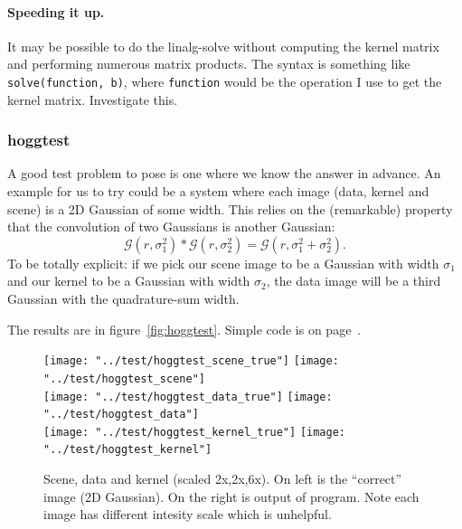 \documentclass[letterpaper, 11pt]{article}
\begin{document}
\paragraph{Speeding it up.} It may be possible to do the linalg-solve without computing the kernel matrix and performing numerous matrix products. The syntax is something like \texttt{solve(function, b)}, where \texttt{function} would be the operation I use to get the kernel matrix. Investigate this.


\subsubsection{hoggtest}

A good test problem to pose is one where we know the answer in advance. An example for us to try could be a system where each image (data, kernel and scene) is a 2D Gaussian of some width. This relies on the (remarkable) property that the convolution of two Gaussians is another Gaussian:
\begin{equation}
	\mathcal{G}(r,\sigma_1^2) \ast \mathcal{G}(r,\sigma_2^2) = \mathcal{G}(r, \sigma_1^2+\sigma_2^2).
\end{equation}
To be totally explicit: if we pick our scene image to be a Gaussian with width $\sigma_1$ and our kernel to be a Gaussian with width $\sigma_2$, the data image will be a third Gaussian with the quadrature-sum width.

The results are in figure~\vref{fig:hoggtest}. Simple code is on page~\pageref{cde:hoggtest}.

\begin{figure}[h]
 	\def\width{0.2\linewidth}
 	\def\scale{2}
 	\centering
 	\texttt{[image: "../test/hoggtest\_scene\_true"]}
 	\texttt{[image: "../test/hoggtest\_scene"]}\\
 	\texttt{[image: "../test/hoggtest\_data\_true"]}
 	\texttt{[image: "../test/hoggtest\_data"]}\\
 	\texttt{[image: "../test/hoggtest\_kernel\_true"]}
 	\texttt{[image: "../test/hoggtest\_kernel"]}\\
 	\caption{Scene, data and kernel (scaled 2x,2x,6x). On left is the ``correct'' image (2D Gaussian). On the right is output of program. Note each image has different intesity scale which is unhelpful.}
 	\label{fig:hoggtest}
\end{figure}
\end{document}
